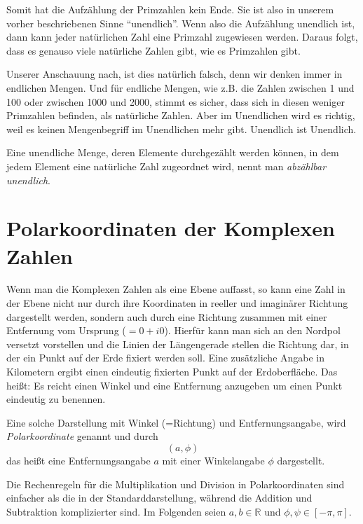 Somit hat die Aufzählung der Primzahlen kein Ende. Sie ist also in unserem vorher beschriebenen Sinne "`unendlich"'. Wenn also die Aufzählung unendlich ist, dann kann jeder natürlichen Zahl eine Primzahl zugewiesen werden. Daraus folgt, dass es genauso viele natürliche Zahlen gibt, wie es Primzahlen gibt. 

Unserer Anschauung nach, ist dies natürlich falsch, denn wir denken immer in endlichen Mengen. Und für endliche Mengen, wie z.B. die Zahlen zwischen 1 und 100 oder zwischen 1000 und 2000, stimmt es sicher, dass sich in diesen weniger Primzahlen befinden, als natürliche Zahlen. Aber im Unendlichen wird es richtig, weil es keinen Mengenbegriff im Unendlichen mehr gibt. Unendlich ist Unendlich.

\begin{definition}
Eine unendliche Menge, deren Elemente durchgezählt werden können, in dem jedem Element eine natürliche Zahl zugeordnet wird, nennt man \textsl{abzählbar unendlich}.\label{abzaehlbar}  
\end{definition}

\section{Polarkoordinaten der Komplexen Zahlen}

Wenn man die Komplexen Zahlen als eine Ebene auffasst, so kann eine Zahl in der Ebene nicht nur durch ihre Koordinaten in reeller und imaginärer Richtung dargestellt werden, sondern auch durch eine Richtung zusammen mit einer Entfernung vom Ursprung ($=0+i0$). Hierfür kann man sich an den Nordpol versetzt vorstellen und die Linien der Längengerade stellen die Richtung dar, in der ein Punkt auf der Erde fixiert werden soll. Eine zusätzliche Angabe in Kilometern ergibt einen eindeutig fixierten Punkt auf der Erdoberfläche. Das heißt: Es reicht einen Winkel und eine Entfernung anzugeben um einen Punkt eindeutig zu benennen. 

\begin{definition}
Eine solche Darstellung mit Winkel (=Richtung) und Entfernungsangabe, wird \textsl{Polarkoordinate} genannt und durch 
\[(a,\phi)\]
das heißt eine Entfernungsangabe $a$ mit einer Winkelangabe $\phi$ dargestellt.
\end{definition}

Die Rechenregeln für die Multiplikation und Division in Polarkoordinaten sind einfacher als die in der Standarddarstellung, während die Addition und Subtraktion komplizierter sind. Im Folgenden seien $a,b \in \mathbb{R}$ und $\phi,\psi \in \left[-\pi, \pi\right]$.

